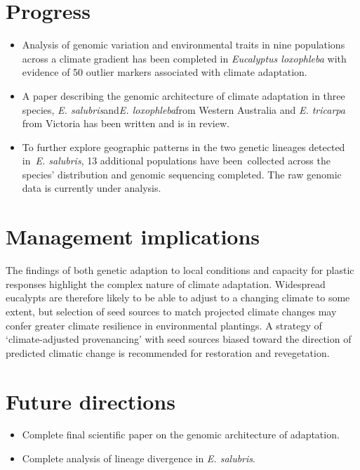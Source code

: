 \documentclass[version=last,
    paper=a4, %
    10pt, %
    usenames,
    dvipsnames,
    oneside, %
    headings=openany, %
    DIV=15 %
]{scrbook}
\begin{document}
\section*{Progress}
\begin{itemize}
\itemsep1pt\parskip0pt
\item
  Analysis of genomic variation and environmental traits in nine
  populations across a climate gradient has been completed in
  \emph{Eucalyptus loxophleba} with evidence of 50 outlier markers
  associated with climate adaptation.
\item
  A paper describing the genomic architecture of climate adaptation in
  three species, \emph{E. salubris}and\emph{E. loxophleba}from Western
  Australia and \emph{E. tricarpa} from Victoria has been written and is
  in review.
\item
  To further explore geographic patterns in the two genetic lineages
  detected in~\emph{E. salubris}, 13 additional populations have
  been~collected across the species' distribution and genomic sequencing
  completed. The raw genomic data is currently under analysis.~
\end{itemize}



\section*{Management implications}
The findings of both genetic adaption to local conditions and capacity
for plastic responses highlight the complex nature of climate
adaptation. Widespread eucalypts are therefore likely to be able to
adjust to a changing climate to some extent, but selection of seed
sources to match projected climate changes may confer greater climate
resilience in environmental plantings. A strategy of `climate-adjusted
provenancing' with seed sources biased toward the direction of predicted
climatic change is recommended for restoration and revegetation.



\section*{Future directions}
\begin{itemize}
\itemsep1pt\parskip0pt
\item
  Complete final scientific paper on the genomic architecture of
  adaptation.~
\item
  Complete analysis of lineage divergence in \emph{E. salubris}.
\end{itemize}

~



\end{document}
